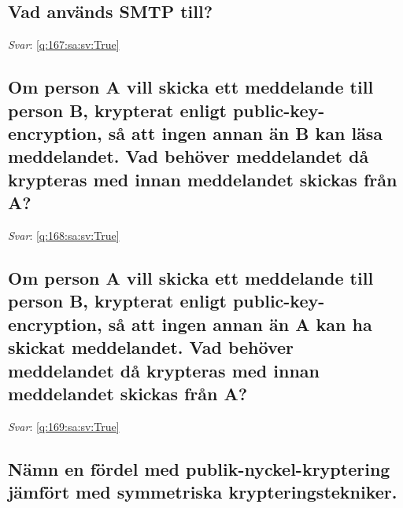 \documentclass[a4paper,11pt,oneside]{article}
\begin{document}
\begin{sloppypar}
\subsection{Vad anv\"ands SMTP till?}

\label{q:167:sa:sv:False}

\vspace{2cm}

\noindent\makebox[\textwidth]{\hrulefill}

\vspace{1cm}

\textit{Svar}: \autoref{q:167:sa:sv:True}



\subsection{Om person A vill skicka ett meddelande till person B, krypterat enligt public-key-encryption, s\r{a} att ingen annan \"an B kan l\"asa meddelandet. Vad beh\"over meddelandet d\r{a} krypteras med innan meddelandet skickas fr\r{a}n A?}

\label{q:168:sa:sv:False}

\vspace{2cm}

\noindent\makebox[\textwidth]{\hrulefill}

\vspace{1cm}

\textit{Svar}: \autoref{q:168:sa:sv:True}



\subsection{Om person A vill skicka ett meddelande till person B, krypterat enligt public-key-encryption, s\r{a} att ingen annan \"an A kan ha skickat meddelandet. Vad beh\"over meddelandet d\r{a} krypteras med innan meddelandet skickas fr\r{a}n A?}

\label{q:169:sa:sv:False}

\vspace{2cm}

\noindent\makebox[\textwidth]{\hrulefill}

\vspace{1cm}

\textit{Svar}: \autoref{q:169:sa:sv:True}



\subsection{N\"amn en f\"ordel med publik-nyckel-kryptering j\"amf\"ort med symmetriska krypteringstekniker.}


\end{sloppypar}
\end{document}
